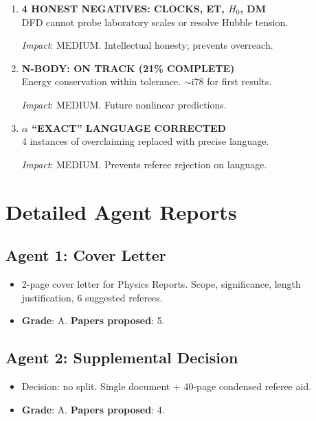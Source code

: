 \documentclass[11pt,a4paper]{article}
\begin{document}
\begin{enumerate}[label=\textbf{\arabic*.}, leftmargin=1.5cm]
\textit{Impact}: MEDIUM-HIGH. Maximises submission success probability.

\item \textbf{4 HONEST NEGATIVES: CLOCKS, ET, $H_0$, DM}\\
DFD cannot probe laboratory scales or resolve Hubble tension.

\textit{Impact}: MEDIUM. Intellectual honesty; prevents overreach.

\item \textbf{N-BODY: ON TRACK (21\% COMPLETE)}\\
Energy conservation within tolerance. $\sim$i78 for first results.

\textit{Impact}: MEDIUM. Future nonlinear predictions.

\item \textbf{$\alpha$ ``EXACT'' LANGUAGE CORRECTED}\\
4 instances of overclaiming replaced with precise language.

\textit{Impact}: MEDIUM. Prevents referee rejection on language.

\end{enumerate}

\section{Detailed Agent Reports}

\subsection{Agent 1: Cover Letter}
\begin{itemize}[nosep]
\item 2-page cover letter for Physics Reports. Scope, significance, length justification, 6 suggested referees.
\item \textbf{Grade}: A. \textbf{Papers proposed}: 5.
\end{itemize}

\subsection{Agent 2: Supplemental Decision}
\begin{itemize}[nosep]
\item Decision: no split. Single document + 40-page condensed referee aid.
\item \textbf{Grade}: A. \textbf{Papers proposed}: 4.
\end{itemize}
\end{document}

